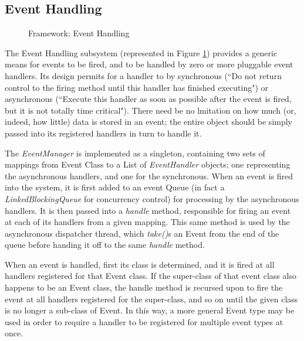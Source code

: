 \documentclass{acm_proc_article-sp}
\begin{document}
\subsection{Event Handling}
{
\begin{figure}[t]
\centering
{}
\caption{Framework: Event Handling}
\label{fig:framework:events}
\end{figure}
The Event Handling subsystem (represented in Figure \ref{fig:framework:events}) provides a generic means for events to be fired, and to be handled by zero or more pluggable event handlers. Its design permits for a handler to by synchronous (``Do not return control to the firing method until this handler has finished executing") or asynchronous (``Execute this handler as soon as possible after the event is fired, but it is not totally time critical"). There need be no lmitation on how much (or, indeed, how little) data is stored in an event; the entire object should be simply passed into its registered handlers in turn to handle it.

The {\textit{EventManager}} is implemented as a singleton, containing two sets of mappings from Event Class to a List of {\textit{EventHandler}} objects; one representing the asynchronous handlers, and one for the synchronous. When an event is fired into the system, it is first added to an event Queue (in fact a {\textit{LinkedBlockingQueue}} for concurrency control) for processing by the asynchronous handlers. It is then passed into a {\textit{handle}} method, responsible for firing an event at each of its handlers from a given mapping. This same method is used by the asynchronous dispatcher thread, which {\textit{take()}}s an Event from the end of the queue before handing it off to the same {\textit{handle}} method.

When an event is handled, first its class is determined, and it is fired at all handlers registered for that Event class. If the super{}-class of that event class also happens to be an Event class, the handle method is recursed upon to fire the event at all handlers registered for the super{}-class, and so on until the given class is no longer a sub{}-class of Event. In this way, a more general Event type may be used in order to require a handler to be registered for multiple event types at once.

}
\end{document}

